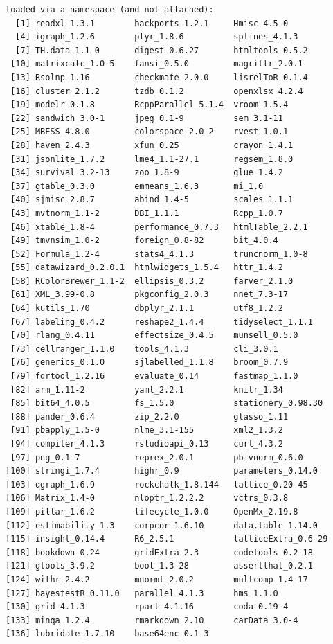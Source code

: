 \documentclass[
]{book}
\begin{document}
\begin{verbatim}
loaded via a namespace (and not attached):
  [1] readxl_1.3.1        backports_1.2.1     Hmisc_4.5-0        
  [4] igraph_1.2.6        plyr_1.8.6          splines_4.1.3      
  [7] TH.data_1.1-0       digest_0.6.27       htmltools_0.5.2    
 [10] matrixcalc_1.0-5    fansi_0.5.0         magrittr_2.0.1     
 [13] Rsolnp_1.16         checkmate_2.0.0     lisrelToR_0.1.4    
 [16] cluster_2.1.2       tzdb_0.1.2          openxlsx_4.2.4     
 [19] modelr_0.1.8        RcppParallel_5.1.4  vroom_1.5.4        
 [22] sandwich_3.0-1      jpeg_0.1-9          sem_3.1-11         
 [25] MBESS_4.8.0         colorspace_2.0-2    rvest_1.0.1        
 [28] haven_2.4.3         xfun_0.25           crayon_1.4.1       
 [31] jsonlite_1.7.2      lme4_1.1-27.1       regsem_1.8.0       
 [34] survival_3.2-13     zoo_1.8-9           glue_1.4.2         
 [37] gtable_0.3.0        emmeans_1.6.3       mi_1.0             
 [40] sjmisc_2.8.7        abind_1.4-5         scales_1.1.1       
 [43] mvtnorm_1.1-2       DBI_1.1.1           Rcpp_1.0.7         
 [46] xtable_1.8-4        performance_0.7.3   htmlTable_2.2.1    
 [49] tmvnsim_1.0-2       foreign_0.8-82      bit_4.0.4          
 [52] Formula_1.2-4       stats4_4.1.3        truncnorm_1.0-8    
 [55] datawizard_0.2.0.1  htmlwidgets_1.5.4   httr_1.4.2         
 [58] RColorBrewer_1.1-2  ellipsis_0.3.2      farver_2.1.0       
 [61] XML_3.99-0.8        pkgconfig_2.0.3     nnet_7.3-17        
 [64] kutils_1.70         dbplyr_2.1.1        utf8_1.2.2         
 [67] labeling_0.4.2      reshape2_1.4.4      tidyselect_1.1.1   
 [70] rlang_0.4.11        effectsize_0.4.5    munsell_0.5.0      
 [73] cellranger_1.1.0    tools_4.1.3         cli_3.0.1          
 [76] generics_0.1.0      sjlabelled_1.1.8    broom_0.7.9        
 [79] fdrtool_1.2.16      evaluate_0.14       fastmap_1.1.0      
 [82] arm_1.11-2          yaml_2.2.1          knitr_1.34         
 [85] bit64_4.0.5         fs_1.5.0            stationery_0.98.30 
 [88] pander_0.6.4        zip_2.2.0           glasso_1.11        
 [91] pbapply_1.5-0       nlme_3.1-155        xml2_1.3.2         
 [94] compiler_4.1.3      rstudioapi_0.13     curl_4.3.2         
 [97] png_0.1-7           reprex_2.0.1        pbivnorm_0.6.0     
[100] stringi_1.7.4       highr_0.9           parameters_0.14.0  
[103] qgraph_1.6.9        rockchalk_1.8.144   lattice_0.20-45    
[106] Matrix_1.4-0        nloptr_1.2.2.2      vctrs_0.3.8        
[109] pillar_1.6.2        lifecycle_1.0.0     OpenMx_2.19.8      
[112] estimability_1.3    corpcor_1.6.10      data.table_1.14.0  
[115] insight_0.14.4      R6_2.5.1            latticeExtra_0.6-29
[118] bookdown_0.24       gridExtra_2.3       codetools_0.2-18   
[121] gtools_3.9.2        boot_1.3-28         assertthat_0.2.1   
[124] withr_2.4.2         mnormt_2.0.2        multcomp_1.4-17    
[127] bayestestR_0.11.0   parallel_4.1.3      hms_1.1.0          
[130] grid_4.1.3          rpart_4.1.16        coda_0.19-4        
[133] minqa_1.2.4         rmarkdown_2.10      carData_3.0-4      
[136] lubridate_1.7.10    base64enc_0.1-3    
\end{verbatim}
\end{document}
